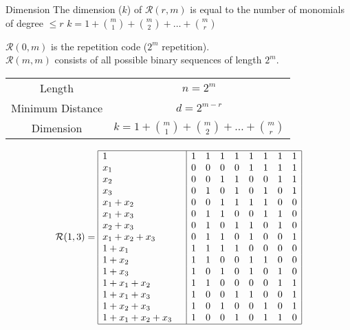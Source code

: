 \message{ !name(1.tex)}\documentclass[xcolor=xvgnames]{beamer}
\newcommand{\RM}[2]{\ensuremath{\mathcal{R}(#1,#2)}}
\begin{document}

\begin{frame}
 \begin{block}{Dimension}
  The dimension ($k$) of $\RM{r}{m}$ is equal to the  number of monomials of degree $\leq r$ \quad $ k= 1+\binom{m}{1}+\binom{m}{2}+\ldots+\binom{m}{r} $
\end{block}

$\RM{0}{m} $ is the repetition code ($2^m$ repetition).\\
$\RM{m}{m}$ consists of all possible binary sequences of length $2^m$.

\begin{center}
\begin{tabular}[center]{|c|c|}
\hline
Length & $n = 2^m$ \\
Minimum Distance & $d = 2^{m-r}$ \\
Dimension & $k= 1+\binom{m}{1}+\binom{m}{2}+\ldots+\binom{m}{r}$ \\
\hline
\end{tabular}
\end{center}

\end{frame}


\begin{frame}
 \begin{equation*}

\RM{1}{3} = \begin{array}{|l|cccccccc|}
\hline
1 \quad&  	 1&1&1&1&1&1&1&1 \\
x_1 \quad& 	 0&0&0&0&1&1&1&1 \\
x_2 \quad& 	 0&0&1&1&0&0&1&1 \\
x_3 \quad&	 0&1&0&1&0&1&0&1 \\
x_1+x_2 \quad&    0&0&1&1&1&1&0&0 \\
x_1+x_3 \quad&	 0&1&1&0&0&1&1&0 \\
x_2+x_3 \quad&	 0&1&0&1&1&0&1&0 \\
x_1+x_2+x_3 \quad& 0&1&1&0&1&0&0&1 \\
1+x_1	\quad&	 1&1&1&1&0&0&0&0 \\
1+x_2	\quad&	 1&1&0&0&1&1&0&0 \\
1+x_3	\quad&	 1&0&1&0&1&0&1&0 \\
1+x_1+x_2 \quad&	 1&1&0&0&0&0&1&1 \\
1+x_1+x_3 \quad&	 1&0&0&1&1&0&0&1 \\
1+x_2+x_3 \quad&	 1&0&1&0&0&1&0&1 \\
1+x_1+x_2+x_3\quad& 1&0&0&1&0&1&1&0 \\
\hline
\end{array}
\end{equation*}
\end{frame}
\end{document}
